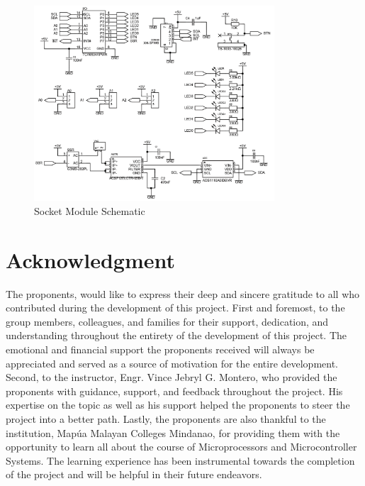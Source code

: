 \documentclass[conference, a4paper]{IEEEtran}
\begin{document}
\begin{figure}[tbh]
  \centering
  \includegraphics[width=0.8\textwidth,]{img/module_schematic.png}
  \caption{Socket Module Schematic}
  \label{fig:socket_schematic}
\end{figure}





\section*{Acknowledgment}
The proponents, would like to express their deep and sincere gratitude to all who contributed during the development of this project.
First and foremost, to the group members, colleagues, and families for their support, dedication, and understanding throughout the entirety of the development of this project. The emotional and financial support the proponents received will always be appreciated and served as a source of motivation for the entire development.
Second, to the instructor, Engr. Vince Jebryl G. Montero, who provided the proponents with guidance, support, and feedback throughout the project. His expertise on the topic as well as his support helped the proponents to steer the project into a better path.
Lastly, the proponents are also thankful to the institution, Mapúa Malayan Colleges Mindanao, for providing them with the opportunity to learn all about the course of Microprocessors and Microcontroller Systems. The learning experience has been instrumental towards the completion of the project and will be helpful in their future endeavors.



\ifCLASSOPTIONcaptionsoff
  \newpage
\fi






\end{document}
